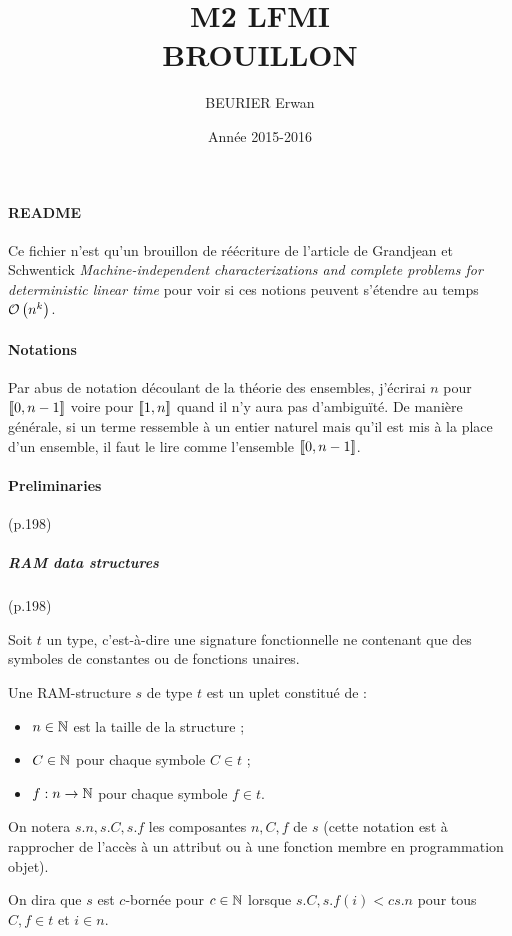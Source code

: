 \documentclass{article}
\author{BEURIER Erwan}
\title{M2 LFMI \\ BROUILLON }
\date{Année 2015-2016}
\begin{document}
	
	
	\paragraph{README}
	Ce fichier n'est qu'un brouillon de réécriture de l'article de Grandjean et Schwentick \emph{Machine-independent characterizations and complete problems for deterministic linear time} pour voir si ces notions peuvent s'étendre au temps $\mathcal{O}\left( n^k \right)$.
	
	
	\paragraph{Notations}
	
	Par abus de notation découlant de la théorie des ensembles, j'écrirai $n$ pour $\left[\!\left[ 0 , n-1 \right]\!\right]$ voire pour $\left[\!\left[ 1 , n \right]\!\right]$ quand il n'y aura pas d'ambiguïté. De manière générale, si un terme ressemble à un entier naturel mais qu'il est mis à la place d'un ensemble, il faut le lire comme l'ensemble $\left[\!\left[ 0 , n-1 \right]\!\right]$.
	
	\pagebreak
	
	\paragraph{Preliminaries} (p.198)
	
		\subparagraph{RAM data structures} (p.198)
	

		\begin{definition}
			Soit $t$ un type, c'est-à-dire une signature fonctionnelle ne contenant que des symboles de constantes ou de fonctions unaires.
			
			Une RAM-structure $s$ de type $t$ est un uplet constitué de :
			\begin{itemize}
				\setlength{\itemsep}{-1mm}
				\item 	$n \in \mathbb{N}$ est la taille de la structure ;
				\item 	$C \in \mathbb{N}$ pour chaque symbole $C \in t$ ;
				\item 	$f : n \to \mathbb{N}$ pour chaque symbole $f \in t$.
			\end{itemize}
			
			On notera $s.n, s.C, s.f$ les composantes $n, C, f$ de $s$ (cette notation est à rapprocher de l'accès à un attribut ou à une fonction membre en programmation objet).
			
			On dira que $s$ est $c$-bornée pour $c\in\mathbb{N}$ lorsque $s.C, s.f(i) < c s.n$ pour tous $C, f \in t$ et $i \in n$.
		\end{definition}
	
\end{document}
